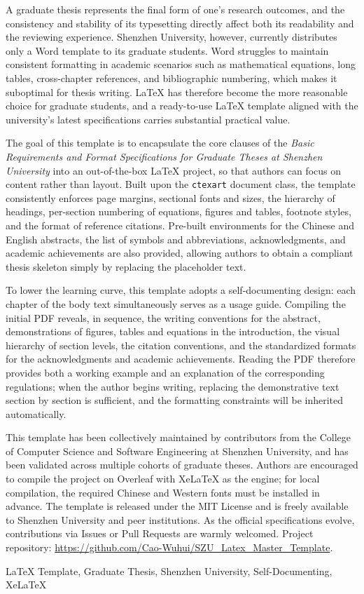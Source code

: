 \begin{abstractEN}
\setlength{\baselineskip}{23pt} %

A graduate thesis represents the final form of one's research outcomes, and the consistency and stability of its typesetting directly affect both its readability and the reviewing experience. Shenzhen University, however, currently distributes only a Word template to its graduate students. Word struggles to maintain consistent formatting in academic scenarios such as mathematical equations, long tables, cross-chapter references, and bibliographic numbering, which makes it suboptimal for thesis writing. \LaTeX{} has therefore become the more reasonable choice for graduate students, and a ready-to-use \LaTeX{} template aligned with the university's latest specifications carries substantial practical value.

The goal of this template is to encapsulate the core clauses of the \textit{Basic Requirements and Format Specifications for Graduate Theses at Shenzhen University} into an out-of-the-box \LaTeX{} project, so that authors can focus on content rather than layout. Built upon the \texttt{ctexart} document class, the template consistently enforces page margins, sectional fonts and sizes, the hierarchy of headings, per-section numbering of equations, figures and tables, footnote styles, and the format of reference citations. Pre-built environments for the Chinese and English abstracts, the list of symbols and abbreviations, acknowledgments, and academic achievements are also provided, allowing authors to obtain a compliant thesis skeleton simply by replacing the placeholder text.

To lower the learning curve, this template adopts a self-documenting design: each chapter of the body text simultaneously serves as a usage guide. Compiling the initial PDF reveals, in sequence, the writing conventions for the abstract, demonstrations of figures, tables and equations in the introduction, the visual hierarchy of section levels, the citation conventions, and the standardized formats for the acknowledgments and academic achievements. Reading the PDF therefore provides both a working example and an explanation of the corresponding regulations; when the author begins writing, replacing the demonstrative text section by section is sufficient, and the formatting constraints will be inherited automatically.

This template has been collectively maintained by contributors from the College of Computer Science and Software Engineering at Shenzhen University, and has been validated across multiple cohorts of graduate theses. Authors are encouraged to compile the project on Overleaf with XeLaTeX as the engine; for local compilation, the required Chinese and Western fonts must be installed in advance. The template is released under the MIT License and is freely available to Shenzhen University and peer institutions. As the official specifications evolve, contributions via Issues or Pull Requests are warmly welcomed. Project repository: \url{https://github.com/Cao-Wuhui/SZU_Latex_Master_Template}.

\end{abstractEN}


\begin{keywordEN}
\LaTeX{} Template, Graduate Thesis, Shenzhen University, Self-Documenting, XeLaTeX
\end{keywordEN}

